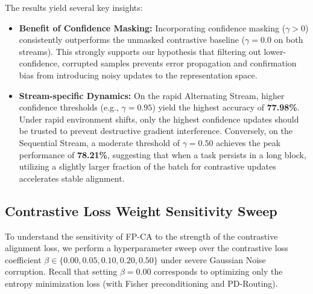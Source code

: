 \documentclass{article}
\theoremstyle{plain}
\theoremstyle{definition}
\theoremstyle{remark}
\begin{document}
\begin{table}[h]
\centering
\caption{Sensitivity Analysis of Confidence Mask Threshold $\gamma$ (under Gaussian Noise)}
\label{tab:gamma_sweep}
\vskip 0.1in
\begin{small}
\end{small}
\end{table}

The results yield several key insights:
\begin{itemize}
  \item \textbf{Benefit of Confidence Masking:} Incorporating confidence masking ($\gamma > 0$) consistently outperforms the unmasked contrastive baseline ($\gamma = 0.0$ on both streams). This strongly supports our hypothesis that filtering out lower-confidence, corrupted samples prevents error propagation and confirmation bias from introducing noisy updates to the representation space.
  \item \textbf{Stream-specific Dynamics:} On the rapid Alternating Stream, higher confidence thresholds (e.g., $\gamma = 0.95$) yield the highest accuracy of \textbf{77.98\%}. Under rapid environment shifts, only the highest confidence updates should be trusted to prevent destructive gradient interference. Conversely, on the Sequential Stream, a moderate threshold of $\gamma = 0.50$ achieves the peak performance of \textbf{78.21\%}, suggesting that when a task persists in a long block, utilizing a slightly larger fraction of the batch for contrastive updates accelerates stable alignment.
\end{itemize}

\subsection{Contrastive Loss Weight Sensitivity Sweep}
To understand the sensitivity of FP-CA to the strength of the contrastive alignment loss, we perform a hyperparameter sweep over the contrastive loss coefficient $\beta \in \{0.00, 0.05, 0.10, 0.20, 0.50\}$ under severe Gaussian Noise corruption. Recall that setting $\beta = 0.00$ corresponds to optimizing only the entropy minimization loss (with Fisher preconditioning and PD-Routing).
\end{document}
